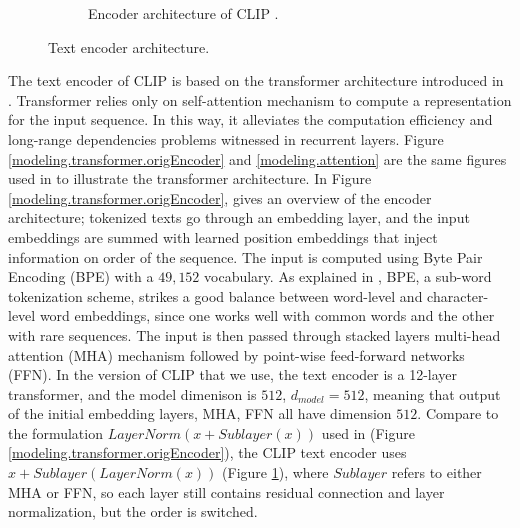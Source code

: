 \begin{figure}[!htb]
\begin{subfigure}{0.5\textwidth}
    \caption{Encoder architecture of CLIP \citep{CLIPpaper}.}
    \label{modeling.attention.clipEncoder}
\end{subfigure}
\caption{Text encoder architecture.}
\label{modeling.transformer}
\end{figure}

The text encoder of CLIP is based on the transformer architecture introduced in \citet{attentionAllYouNeed}. Transformer relies only on self-attention mechanism to compute a representation for the input sequence. In this way, it alleviates the computation efficiency and long-range dependencies problems witnessed in recurrent layers.  
Figure \ref{modeling.transformer.origEncoder} and \ref{modeling.attention} are the same figures used in \cite{attentionAllYouNeed} to illustrate the transformer architecture. In Figure \ref{modeling.transformer.origEncoder}, \cite{attentionAllYouNeed} gives an overview of the encoder architecture; tokenized texts go through an embedding layer, and the input embeddings are summed with learned position embeddings that inject information on order of the sequence. 
The input is computed using Byte Pair Encoding (BPE) with a $49,152$ vocabulary. As explained in \cite{Radford2019LanguageMA}, BPE, a sub-word tokenization scheme, strikes a good balance between word-level and character-level word embeddings, since one works well with common words and the other with rare sequences.
The input is then passed through stacked layers multi-head attention (MHA) mechanism followed by point-wise feed-forward networks (FFN). 
In the version of CLIP that we use, the text encoder is a 12-layer transformer, and the model dimenison is $512$, $d_{model} = 512$, meaning that output of the initial embedding layers, MHA, FFN all have dimension $512$.  
Compare to the formulation $LayerNorm(x + Sublayer(x))$ used in \cite{attentionAllYouNeed} (Figure \ref{modeling.transformer.origEncoder}), the CLIP text encoder uses $x + Sublayer(LayerNorm(x))$ (Figure \ref{modeling.attention.clipEncoder}), where $Sublayer$ refers to either MHA or FFN, so each layer still contains residual connection and layer normalization, but the order is switched. 


